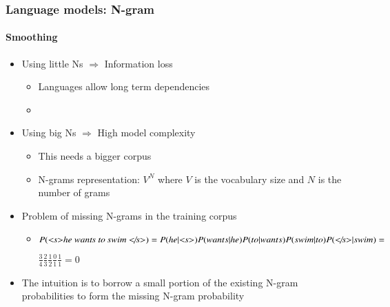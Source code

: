 \documentclass[xcolor=table]{beamer}
\begin{document}
\begin{frame}
\frametitle{Language models: N-gram}
\framesubtitle{Smoothing}

\begin{itemize}
	
	\item Using little Ns $ \Longrightarrow $ Information loss
	\begin{itemize}
		\item Languages allow long term dependencies
		\item {}
	\end{itemize}

	\item Using big Ns $ \Longrightarrow $ High model complexity
	\begin{itemize}
		\item This needs a bigger corpus
		\item N-grams representation: $V^N$ where $V$ is the vocabulary size and $N$ is the number of grams
	\end{itemize}

	\item Problem of missing N-grams in the training corpus
	\begin{itemize}
		\item $P(\text{\textit{\textless s\textgreater he wants to swim \textless/s\textgreater}}) = 
		P(he|\text{\textit{\textless s\textgreater}}) P(wants|he) P(to|wants) P(swim|to)  P(\text{\textit{\textless/s\textgreater}}|swim) = $
		
		$\frac{3}{4} \frac{2}{3} \frac{1}{2} \frac{0}{1} \frac{1}{1} = 0$
	\end{itemize}
	\item The intuition is to borrow a small portion of the existing N-gram probabilities to form the missing N-gram probability
\end{itemize}

\end{frame}
\end{document}
